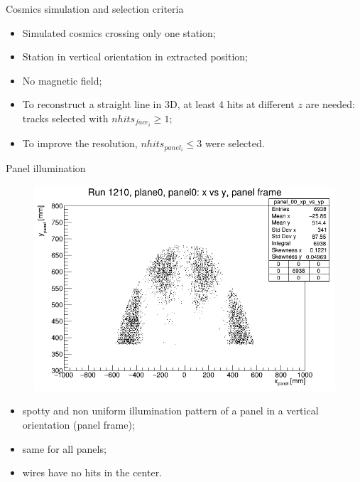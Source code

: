 \documentclass{beamer}[10pt]
\begin{document}
\begin{frame}{Cosmics simulation and selection criteria}
  \begin{itemize}
    \item Simulated cosmics crossing only one station;
    \vspace{3mm}
    \item Station in vertical orientation in extracted position;
    \vspace{3mm}
    \item No magnetic field;
    \vspace{3mm}
    \item To reconstruct a straight line in 3D, at least 4 hits at different $z$ are needed: tracks selected with $nhits_{face_i}\geq 1$;
    \vspace{3mm}
    \item To improve the resolution, $nhits_{panel_i}\leq 3$ were selected.
  \end{itemize}
\end{frame}



\begin{frame}{Panel illumination}
   \vspace{-3mm}
            \begin{figure}[H]
                \centering
                \includegraphics[width=0.7 \textwidth]{figures/pdf/xp_vs_yp_panel0.png}
                \label{fig:enter-label}
            \end{figure}
\begin{itemize}
  \item spotty and non uniform illumination pattern of a panel in a vertical orientation (panel frame);
    \item same for all panels;
  \item wires have no hits in the center.
\end{itemize}

\end{frame}
\end{document}
